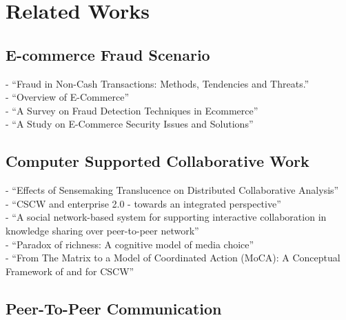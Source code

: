 
\chapter{Related Works}
\label{cha:related_works}


\section{E-commerce Fraud Scenario}
\label{sec:related_e_commerce}

- ``Fraud in Non-Cash Transactions: Methods, Tendencies and Threats.'' \citep{sobko2014fraud} \\
- ``Overview of E-Commerce'' \citep{ankhule2015overview} \\
- ``A Survey on Fraud Detection Techniques in Ecommerce'' \citep{rana2015survey} \\
- ``A Study on E-Commerce Security Issues and Solutions'' \citep{sen2015study}


\section{Computer Supported Collaborative Work}
\label{sec:related_cscw}

- ``Effects of Sensemaking Translucence on Distributed Collaborative Analysis'' \citep{goyaleffects} \\
- ``CSCW and enterprise 2.0 - towards an integrated perspective'' \citep{Koch2008} \\
- ``A social network-based system for supporting interactive collaboration in knowledge sharing over peer-to-peer network'' \citep{yang2008social} \\
- ``Paradox of richness: A cognitive model of media choice'' \citep{robert2005paradox} \\
- ``From The Matrix to a Model of Coordinated Action (MoCA): A Conceptual Framework of and for CSCW'' \citep{lee2015matrix} \\


\section{Peer-To-Peer Communication}
\label{sec:related_p2p}

